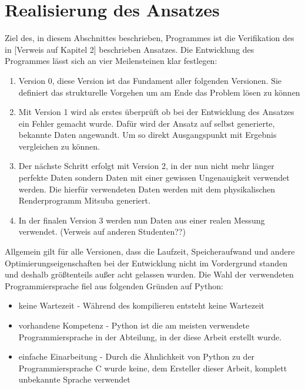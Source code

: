 
\chapter{Realisierung des Ansatzes}

Ziel des, in diesem Abschnittes beschrieben, Programmes ist die Verifikation des in [Verweis auf Kapitel 2] beschrieben Ansatzes. Die Entwicklung des Programmes lässt sich an vier Meilensteinen klar festlegen:

\begin{enumerate}
	\item Version 0, diese Version ist das Fundament aller folgenden Versionen. Sie definiert das strukturelle Vorgehen um am Ende das Problem lösen zu können
	
	\item Mit Version 1 wird als erstes überprüft ob bei der Entwicklung des Ansatzes ein Fehler gemacht wurde. Dafür wird der Ansatz auf selbst generierte, bekannte Daten angewandt. Um so direkt Ausgangspunkt mit Ergebnis vergleichen zu können.
	
	\item Der nächste Schritt erfolgt mit Version 2, in der nun nicht mehr länger perfekte Daten sondern Daten mit einer gewissen Ungenauigkeit verwendet werden. Die hierfür verwendeten Daten werden mit dem physikalischen Renderprogramm Mitsuba generiert. 
	
	\item In der finalen Version 3 werden nun Daten aus einer realen Messung verwendet. (Verweis auf anderen Studenten??)
\end{enumerate}

Allgemein gilt für alle Versionen, dass die Laufzeit, Speicheraufwand und andere Optimierungseigenschaften bei der Entwicklung nicht im Vordergrund standen und deshalb größtenteils außer acht gelassen wurden. Die Wahl der verwendeten Programmiersprache fiel aus folgenden Gründen auf Python:

\begin{itemize}
	\item keine Wartezeit - Während des kompilieren entsteht keine Wartezeit
	\item vorhandene Kompetenz - Python ist die am meisten verwendete Programmiersprache in der Abteilung, in der diese Arbeit erstellt wurde.
	\item einfache Einarbeitung - Durch die Ähnlichkeit von Python zu der Programmiersprache C wurde keine, dem Ersteller dieser Arbeit, komplett unbekannte Sprache verwendet
\end{itemize} 




